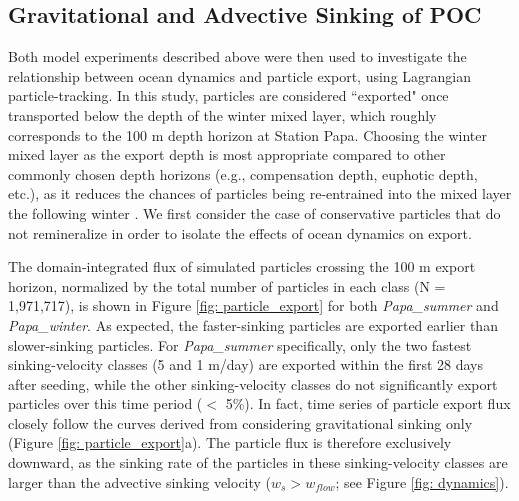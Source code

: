 \documentclass[draft,linenumbers]{agujournal2018}
\newcommand{\fixme}[1]{\color{red}$<$\textbf{FIX ME: #1}$>$\color{black}}
\begin{document}
\subsection{Gravitational and Advective Sinking of POC}

Both model experiments described above were then used to investigate the relationship between ocean dynamics and particle export, using Lagrangian particle-tracking. In this study, particles are considered ``exported" once transported below the depth of the winter mixed layer, which roughly corresponds to the 100 m depth horizon at Station Papa. Choosing the winter mixed layer as the export depth is most appropriate compared to other commonly chosen depth horizons (e.g., compensation depth, euphotic depth, etc.), as it reduces the chances of particles being re-entrained into the mixed layer the following winter \citep{Palevsky_2016,Palevsky_2018}. We first consider the case of conservative particles that do not remineralize in order to isolate the effects of ocean dynamics on export.

The domain-integrated flux of simulated particles crossing the 100 m export horizon, normalized by the total number of particles in each class (N = 1,971,717), is shown in Figure \ref{fig: particle_export} for both \textit{Papa\_summer} and \textit{Papa\_winter}. As expected, the faster-sinking particles are exported earlier than slower-sinking particles. For \textit{Papa\_summer} specifically, only the two fastest sinking-velocity classes (5 and 1 m/day) are exported within the first 28 days after seeding, while the other sinking-velocity classes do not significantly export particles over this time period ($<$ 5\%). In fact, time series of particle export flux closely follow the curves derived from considering gravitational sinking only (Figure \ref{fig: particle_export}a). The particle flux is therefore exclusively downward, as the sinking rate of the particles in these sinking-velocity classes are larger than the advective sinking velocity ($w_s > w_{flow}$; see Figure \ref{fig: dynamics}).

\end{document}
